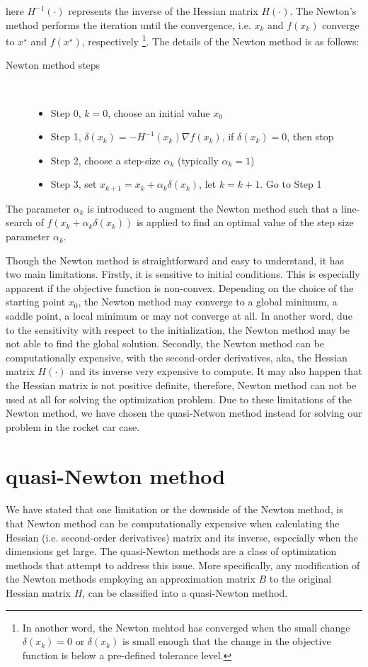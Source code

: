 here $ H^{-1}(\cdot)$ represents the inverse of the Hessian matrix $H(\cdot)$. The Newton's method performs the iteration until the convergence, i.e. $x_k$ and $f(x_k)$ converge to $x^\star$ and $f(x^\star)$, respectively \footnote{In another word, the Newton mehtod has converged when the small change $\delta(x_k) =0$ or $\delta(x_k)$ is small enough that the change in the objective function is below a pre-defined tolerance level.}. The details of the Newton method is as follows: 
\begin{description}
	\item[Newton method steps]\ 
	\begin{itemize}
		\item Step 0, $k=0$, choose an initial value $x_0$ 
		\item Step 1, $\delta(x_k)  =- H^{-1}(x_k)\nabla f(x_k)$, if $\delta(x_k) =0$, then stop
		\item Step 2, choose a step-size $\alpha_k$ (typically $\alpha_k =1$)
		\item Step 3, set $x_{k+1}  = x_k + \alpha_k \delta(x_k) $, let $k= k+1$. Go to Step 1
	\end{itemize}
\end{description}

The parameter $\alpha_k$ is introduced to augment the Newton method such that a line-search of $f(x_k + \alpha_k \delta(x_k))$ is applied to find an optimal value of the step size parameter $\alpha_k$. 

Though the Newton method is straightforward and easy to understand, it has two main limitations. Firstly, it is sensitive to initial conditions. This is especially apparent if the objective function is non-convex. Depending on the choice of the starting point $x_0$, the Newton method may converge to a global minimum, a saddle point, a local minimum or may not converge at all. In another word, due to the sensitivity with respect to the initialization, the Newton method may be not able to find the global solution. Secondly, the Newton method can be computationally expensive, with the second-order derivatives, aka, the Hessian matrix $H(\cdot)$ and its inverse very expensive to compute. It may also happen that the Hessian matrix is not positive definite, therefore, Newton method can not be used at all for solving the optimization problem. Due to these limitations of the Newton method, we have chosen the quasi-Netwon method instead for solving our problem in the rocket car case. 

\section{quasi-Newton method}
We have stated that one limitation or the downside of the Newton method, is that Newton method can be computationally expensive when calculating the Hessian (i.e. second-order derivatives)  matrix and its inverse, especially when the dimensions get large. The quasi-Newton methods are a class of optimization methods that attempt to address this issue. More specifically, any modification of the Newton methods employing an approximation matrix $B$ to the original Hessian matrix $H$, can be classified into a quasi-Newton method. 

